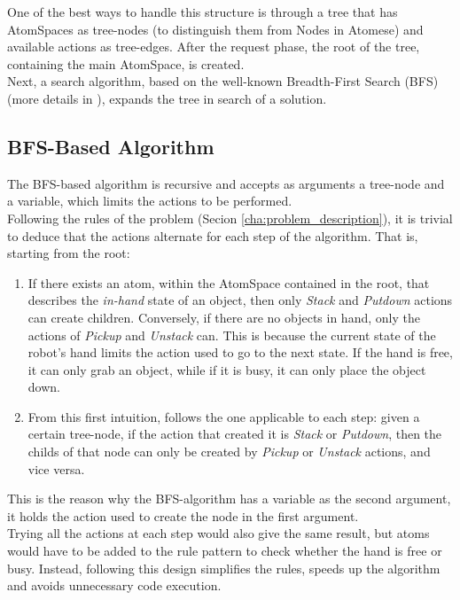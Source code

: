 One of the best ways to handle this structure is through a tree that has AtomSpaces as tree-nodes (to distinguish them from Nodes in Atomese) and available actions as tree-edges. 
After the request phase, the root of the tree, containing the main AtomSpace, is created. \\
Next, a search algorithm, based on the well-known Breadth-First Search (BFS) (more details in \cite{BFS-wiki, BFS}), expands the tree in search of a solution.

\subsection{BFS-Based Algorithm}\label{sec:bfs_search}

The BFS-based algorithm is recursive and accepts as arguments a tree-node and a variable, which limits the actions to be performed. \\
Following the rules of the problem (Secion \ref{cha:problem_description}), it is trivial to deduce that the actions alternate for each step of the algorithm.
That is, starting from the root:

\begin{enumerate} 
	\item If there exists an atom, within the AtomSpace contained in the root, that describes the \textit{in-hand} state of an object, then only \textit{Stack} and \textit{Putdown} actions can create children. Conversely, if there are no objects in hand, only the actions of \textit{Pickup} and \textit{Unstack} can. This is because the current state of the robot's hand limits the action used to go to the next state. If the hand is free, it can only grab an object, while if it is busy, it can only place the object down.

	\item From this first intuition, follows the one applicable to each step: given a certain tree-node, if the action that created it is \textit{Stack} or \textit{Putdown}, then the childs of that node can only be created by \textit{Pickup} or \textit{Unstack} actions, and vice versa.
\end{enumerate}

This is the reason why the BFS-algorithm has a variable as the second argument, it holds the action used to create the node in the first argument. \\
Trying all the actions at each step would also give the same result, but atoms would have to be added to the rule pattern to check whether the hand is free or busy.
Instead, following this design simplifies the rules, speeds up the algorithm and avoids unnecessary code execution.


